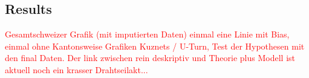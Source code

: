 \documentclass[twoside]{article}\usepackage[]{graphicx}\usepackage[]{color}
\begin{document}
\begin{multicols}{2}






\section{Results}

\textcolor{red}{Gesamtschweizer Grafik (mit imputierten Daten) einmal eine Linie mit Bias, einmal ohne
Kantonsweise Grafiken
Kuznets / U-Turn, Test der Hypothesen mit den final Daten. Der link zwischen rein deskriptiv  und Theorie plus Modell ist aktuell noch ein krasser Drahtseilakt...}



\end{multicols}
\end{document}
